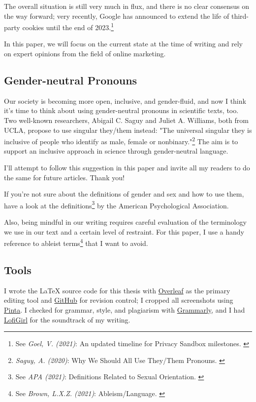 The overall situation is still very much in flux, and there is no clear consensus on the way forward; very recently, Google has announced to extend the life of third-party cookies until the end of 2023.\footnote{See \textit{Goel, V. (2021)}: An updated timeline for Privacy Sandbox milestones. \cite{sandboxDelay}}

In this paper, we will focus on the current state at the time of writing and rely on expert opinions from the field of online marketing.

\subsection{Gender-neutral Pronouns}

Our society is becoming more open, inclusive, and gender-fluid, and now I think it's time to think about using gender-neutral pronouns in scientific texts, too. Two well-known researchers, Abigail C. Saguy and Juliet A. Williams, both from UCLA, propose to use singular they/them instead: "The universal singular they is inclusive of people who identify as male, female or nonbinary."\footnote{\textit{Saguy, A. (2020)}: Why We Should All Use They/Them Pronouns. \cite{pronouns}} The aim is to support an inclusive approach in science through gender-neutral language. 

I'll attempt to follow this suggestion in this paper and invite all my readers to do the same for future articles. Thank you!

If you're not sure about the definitions of gender and sex and how to use them, have a look at the definitions\footnote{See \textit{APA (2021)}: Definitions Related to Sexual Orientation. \cite{apaDefinitions}} by the American Psychological Association.

Also, being mindful in our writing requires careful evaluation of the terminology we use in our text and a certain level of restraint. For this paper, I use a handy reference to ableist terms\footnote{See \textit{Brown, L.X.Z. (2021)}: Ableism/Language. \cite{ableismLanguage}} that I want to avoid.

\subsection{Tools}

I wrote the LaTeX source code for this thesis with \href{https://www.overleaf.com/}{Overleaf} as the primary editing tool and \href{https://github.com/chfrank-cgn/Bachelor-Arbeit}{GitHub} for revision control; I cropped all screenshots using \href{https://www.pinta-project.com/}{Pinta}. I checked for grammar, style, and plagiarism with \href{https://app.grammarly.com/}{Grammarly}, and I had \href{https://www.youtube.com/watch?v=5qap5aO4i9A}{LofiGirl} for the soundtrack of my writing.


